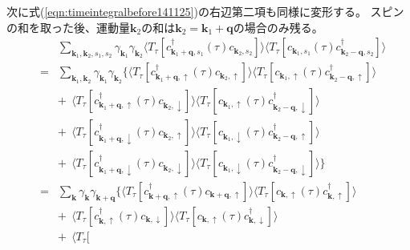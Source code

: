 \documentclass[a4j]{jsarticle}
\begin{document}
次に式(\ref{eqn:timeintegralbefore141125})の右辺第二項も同様に変形する。
スピンの和を取った後、運動量$\bm{k}_{2}$の和は$\bm{k}_{2} = \bm{k}_{1} + \bm{q}$の場合のみ残る。
%
%
%
%
\begin{eqnarray}
	&&
	\sum_{\bm{k}_{1} , \bm{k}_{2} , s_{1} ,s_{2} }
	\gamma_{\bm{k}_{1}}
	\gamma_{\bm{k}_{2}}
	\langle T_{\tau} [
			c_{ \bm{k}_{1}+\bm{q} , s_{1} }^{\dagger} (\tau)
			c_{ \bm{k}_{2} , s_{2} }
		] \rangle
	\langle T_{\tau} [
			c_{ \bm{k}_{1} , s_{1} } (\tau)
			c_{ \bm{k}_{2}-\bm{q} , s_{2} }^{\dagger}
		] \rangle
	\\ &=&
	\sum_{\bm{k}_{1} , \bm{k}_{2} }
	\gamma_{\bm{k}_{1}}
	\gamma_{\bm{k}_{2}}
	\Big\{
	\langle T_{\tau} [
			c_{ \bm{k}_{1}+\bm{q} , \uparrow }^{\dagger} (\tau)
			c_{ \bm{k}_{2} , \uparrow }
		] \rangle
	\langle T_{\tau} [
			c_{ \bm{k}_{1} , \uparrow } (\tau)
			c_{ \bm{k}_{2}-\bm{q} , \uparrow }^{\dagger}
		] \rangle
	\nonumber \\[2mm] && + \ \
	\langle T_{\tau} [
			c_{ \bm{k}_{1}+\bm{q} , \uparrow }^{\dagger} (\tau)
			c_{ \bm{k}_{2} , \downarrow }
		] \rangle
	\langle T_{\tau} [
			c_{ \bm{k}_{1} , \uparrow } (\tau)
			c_{ \bm{k}_{2}-\bm{q} , \downarrow }^{\dagger}
		] \rangle
	\nonumber \\[2mm] && + \ \
	\langle T_{\tau} [
			c_{ \bm{k}_{1}+\bm{q} , \downarrow }^{\dagger} (\tau)
			c_{ \bm{k}_{2} , \uparrow }
		] \rangle
	\langle T_{\tau} [
			c_{ \bm{k}_{1} , \downarrow } (\tau)
			c_{ \bm{k}_{2}-\bm{q} , \uparrow }^{\dagger}
		] \rangle
	\nonumber \\[2mm] && + \ \
	\langle T_{\tau} [
			c_{ \bm{k}_{1}+\bm{q} , \downarrow }^{\dagger} (\tau)
			c_{ \bm{k}_{2} , \downarrow }
		] \rangle
	\langle T_{\tau} [
			c_{ \bm{k}_{1} , \downarrow } (\tau)
			c_{ \bm{k}_{2}-\bm{q} , \downarrow }^{\dagger}
		] \rangle
	\Big\}
	\nonumber \\[3mm]
	&=&
	\sum_{ \bm{k} }
	\gamma_{\bm{k}}
	\gamma_{\bm{k}+\bm{q}}
	\Big\{
	\langle T_{\tau} [
			c_{ \bm{k}+\bm{q} , \uparrow }^{\dagger} (\tau)
			c_{ \bm{k}+\bm{q} , \uparrow }
		] \rangle
	\langle T_{\tau} [
			c_{ \bm{k} , \uparrow } (\tau)
			c_{ \bm{k} , \uparrow }^{\dagger}
		] \rangle
	\nonumber \\[2mm] && + \ \
	\langle T_{\tau} [
			c_{ \bm{k} , \uparrow }^{\dagger} (\tau)
			c_{ \bm{k} , \downarrow }
		] \rangle
	\langle T_{\tau} [
			c_{ \bm{k} , \uparrow } (\tau)
			c_{ \bm{k} , \downarrow }^{\dagger}
		] \rangle
	\nonumber \\[2mm] && + \ \
	\langle T_{\tau} [

\end{eqnarray}
\end{document}
